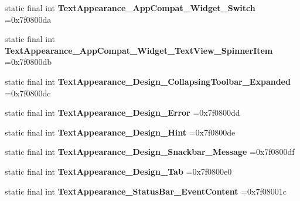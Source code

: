 \begin{DoxyCompactItemize}
\item 
\hypertarget{classcheck_1_1test_1_1_r_1_1style_a548599f77a3544221fb33801b1f5ebdf}{}static final int {\bfseries Text\+Appearance\+\_\+\+App\+Compat\+\_\+\+Widget\+\_\+\+Switch} =0x7f0800da\label{classcheck_1_1test_1_1_r_1_1style_a548599f77a3544221fb33801b1f5ebdf}

\item 
\hypertarget{classcheck_1_1test_1_1_r_1_1style_a2689d8f268a05a6ec567a20c8b2ebc31}{}static final int {\bfseries Text\+Appearance\+\_\+\+App\+Compat\+\_\+\+Widget\+\_\+\+Text\+View\+\_\+\+Spinner\+Item} =0x7f0800db\label{classcheck_1_1test_1_1_r_1_1style_a2689d8f268a05a6ec567a20c8b2ebc31}

\item 
\hypertarget{classcheck_1_1test_1_1_r_1_1style_a67854ac7ebf2c505f252d79df82f3338}{}static final int {\bfseries Text\+Appearance\+\_\+\+Design\+\_\+\+Collapsing\+Toolbar\+\_\+\+Expanded} =0x7f0800dc\label{classcheck_1_1test_1_1_r_1_1style_a67854ac7ebf2c505f252d79df82f3338}

\item 
\hypertarget{classcheck_1_1test_1_1_r_1_1style_a9cebdc0746110fcd29c38f6fab5fb2d3}{}static final int {\bfseries Text\+Appearance\+\_\+\+Design\+\_\+\+Error} =0x7f0800dd\label{classcheck_1_1test_1_1_r_1_1style_a9cebdc0746110fcd29c38f6fab5fb2d3}

\item 
\hypertarget{classcheck_1_1test_1_1_r_1_1style_abe4a0e5dfe08f2267dbfca82c438fcb4}{}static final int {\bfseries Text\+Appearance\+\_\+\+Design\+\_\+\+Hint} =0x7f0800de\label{classcheck_1_1test_1_1_r_1_1style_abe4a0e5dfe08f2267dbfca82c438fcb4}

\item 
\hypertarget{classcheck_1_1test_1_1_r_1_1style_a5d4ddf77cb6169134d3662e576504bc6}{}static final int {\bfseries Text\+Appearance\+\_\+\+Design\+\_\+\+Snackbar\+\_\+\+Message} =0x7f0800df\label{classcheck_1_1test_1_1_r_1_1style_a5d4ddf77cb6169134d3662e576504bc6}

\item 
\hypertarget{classcheck_1_1test_1_1_r_1_1style_a68ef6e2a8a3b917fe8c5bfa4556a638d}{}static final int {\bfseries Text\+Appearance\+\_\+\+Design\+\_\+\+Tab} =0x7f0800e0\label{classcheck_1_1test_1_1_r_1_1style_a68ef6e2a8a3b917fe8c5bfa4556a638d}

\item 
\hypertarget{classcheck_1_1test_1_1_r_1_1style_ab0df1433238164e898a84f9d439d1122}{}static final int {\bfseries Text\+Appearance\+\_\+\+Status\+Bar\+\_\+\+Event\+Content} =0x7f08001c\label{classcheck_1_1test_1_1_r_1_1style_ab0df1433238164e898a84f9d439d1122}


\end{DoxyCompactItemize}
